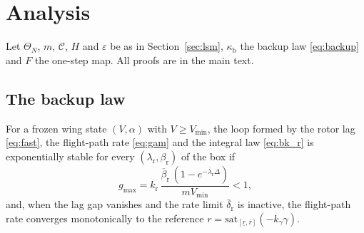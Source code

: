 \section{Analysis}\label{sec:analysis}
Let $\Theta_N$, $m$, $\mathcal C$, $H$ and $\varepsilon$ be as in Section~\ref{sec:lsm}, $\kappa_{\mathrm b}$ the backup law \eqref{eq:backup} and $F$ the one-step map. All proofs are in the main text.

\subsection{The backup law}
\begin{lemma}\label{lem:corner}
For a frozen wing state $(V,\alpha)$ with $V\ge V_{\min}$, the loop formed by the rotor lag \eqref{eq:fast}, the flight-path rate \eqref{eq:gam} and the integral law \eqref{eq:bk_r} is exponentially stable for every $(\lambda_{\mathrm r},\beta_{\mathrm r})$ of the box if
\begin{equation}\label{eq:kr}
g_{\max}=k_{\mathrm r}\,\frac{\overline\beta_{\mathrm r}\,(1-e^{-\overline\lambda_{\mathrm r}\Delta})}{mV_{\min}}<1,
\end{equation}
and, when the lag gap vanishes and the rate limit $\bar\delta_{\mathrm r}$ is inactive, the flight-path rate converges monotonically to the reference $r=\mathrm{sat}_{[\underline r,\overline r]}(-k_\gamma\gamma)$.
\end{lemma}
